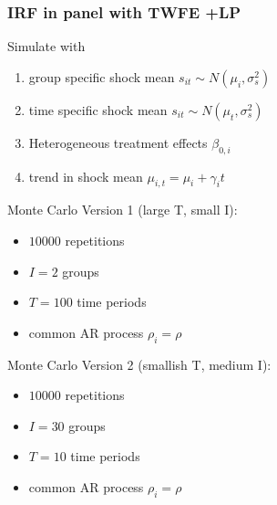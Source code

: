 \documentclass[notes,11pt, aspectratio = 169]{beamer}
\begin{document}
\begin{frame}\frametitle{IRF in panel with TWFE +LP}

    \begin{wideitemize} 
        \item Simulate with  
        \begin{enumerate}
            \item group specific shock mean $s_{it} \sim N(\mu_i, \sigma_s^2)$
            \item time specific shock mean $s_{it} \sim N(\mu_t, \sigma_s^2)$
            \item Heterogeneous treatment effects $\beta_{0,i}$ 
            \item trend in shock mean $\mu_{i,t} = \mu_i + \gamma_i t$ 
        \end{enumerate}
        \item Monte Carlo Version 1 (large T, small I): 
            \begin{itemize}
                \item $10 000$ repetitions 
                \item $I = 2$ groups
                \item $T = 100$ time periods
                \item common AR process $\rho_i=\rho$
            \end{itemize}
        \item Monte Carlo Version 2 (smallish T, medium I): 
            \begin{itemize}
                \item $10 000$ repetitions 
                \item $I = 30$ groups
                \item $T = 10$ time periods
                \item common AR process $\rho_i=\rho$
            \end{itemize}
    \end{wideitemize}

\end{frame}

  
\end{document}

